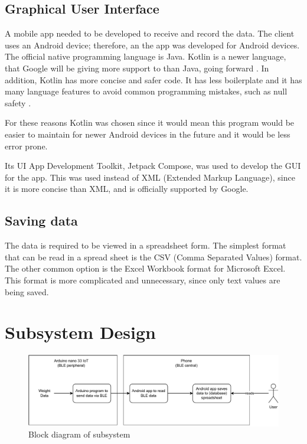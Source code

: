 \documentclass[class=report,11pt,crop=false]{standalone}
\begin{document}
		\subsection{Graphical User Interface}
		A mobile app needed to be developed to receive and record the data. The client uses an Android device; therefore, an the app was developed for Android devices. The official native programming language is Java. Kotlin is a newer language, that Google will be giving more support to than Java, going forward \cite{kotlin}. In addition, Kotlin has more concise and safer code. It has less boilerplate and it has many language features to avoid common programming mistakes, such as null safety \cite{kotlin}.
		
		For these reasons Kotlin was chosen since it would mean this program would be easier to maintain for newer Android devices in the future and it would be less error prone.
		
		Its UI App Development Toolkit, Jetpack Compose, was used to develop the GUI for the app. This was used instead of XML (Extended Markup Language), since it is more concise than XML, and is officially supported by Google.
			
		
		\subsection{Saving data}
		The data is required to be viewed in a spreadsheet form. The simplest format that can be read in a spread sheet is the CSV (Comma Separated Values) format. The other common option is the Excel Workbook format for Microsoft Excel. This format is more complicated and unnecessary, since only text values are being saved.
		
	
	\section{Subsystem Design}
		
		\begin{figure}[h!]
			\centering
			\includegraphics[width=0.9\linewidth]{Figures/Starling data block diagram.pdf}
			\caption{Block diagram of subsystem}
		\end{figure}
		
\end{document}
